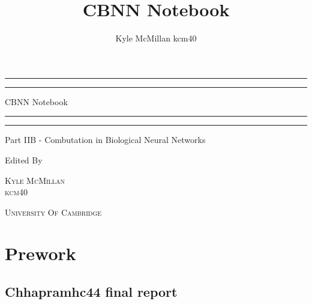 \documentclass[a4paper, 11pt, oneside]{report}
\author{Kyle McMillan kcm40}
\title{CBNN Notebook}
\begin{document}

\begin{titlepage}
    \centering %
	
	\scshape %
	
	\vspace*{\baselineskip} %
	
	\rule{\textwidth}{1.6pt}\vspace*{-\baselineskip}\vspace*{2pt} %
	\rule{\textwidth}{0.4pt} %
	
	\vspace{0.75\baselineskip} %
	
	{\LARGE CBNN Notebook} %
	
	\vspace{0.75\baselineskip} %
	
	\rule{\textwidth}{0.4pt}\vspace*{-\baselineskip}\vspace{3.2pt} %
	\rule{\textwidth}{1.6pt} %
	
	\vspace{2\baselineskip} %
	
	
	Part IIB - Combutation in Biological Neural Networks %
	
	\vspace*{3\baselineskip} %
	
	
	Edited By
	
	\vspace{0.5\baselineskip} %
	
	{\scshape\Large Kyle McMillan \\ kcm40} %
	
	\vspace{0.5\baselineskip} %
	
    \textsc{University Of Cambridge} %
	
	\vfill %

\end{titlepage}

\chapter{Prework}
\section{Chhapramhc44 final report}
\end{document}
